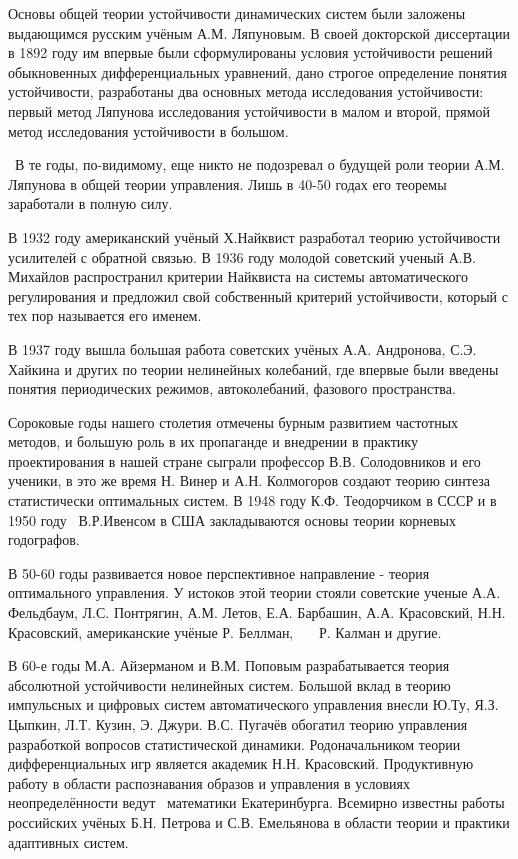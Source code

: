 		Основы общей теории устойчивости динамических систем были за­ложены выдающимся русским учёным А.М. Ляпуновым. В своей
		докторской диссертации в 1892 году им впервые были сформулированы условия ус­тойчивости решений обыкновенных
		дифференциальных уравнений, дано строгое определение понятия устойчивости, разработаны два основных метода исследования
		устойчивости: первый метод Ляпунова исследования устойчивости в малом и второй, прямой метод исследования устойчивости
		в большом.



		\ В те годы, по-видимому, еще никто не подоз­ревал о будущей роли теории А.М. Ляпунова в общей теории управления. Лишь в
		40-50 годах его теоремы заработали в полную силу.



		В 1932 году американский учёный Х.Найквист разработал теорию устойчивости усилителей с обратной связью. В 1936 году
		молодой со­ветский ученый А.В. Михайлов распространил критерии Найквиста на системы автоматического регулирования и
		предложил свой собственный критерий устойчивости, который с тех пор называется его именем.



		В 1937 году вышла большая работа советских учёных А.А. Андро­нова, С.Э. Хайкина и других по теории нелинейных колебаний,
		где впервые были введены понятия периодических режимов, автоколебаний, фазового пространства.



		Сороковые годы нашего столетия отмечены бурным развитием час­тотных методов, и большую роль в их пропаганде и внедрении
		в прак­тику проектирования в нашей стране сыграли профессор В.В. Солодовни­ков и его ученики, в это же время Н. Винер и
		А.Н. Колмогоров создают теорию синтеза статистически оптимальных систем. В 1948 году К.Ф. Теодорчиком в СССР и в 1950
		году \ В.Р.Ивенсом в США закладываются осно­вы теории корневых годографов.



		В 50-60 годы развивается новое перспективное направление - теория оптимального управления. У истоков этой теории стояли
		совет­ские ученые А.А. Фельдбаум, Л.С. Понтрягин, А.М. Летов, Е.А. Барбашин, А.А. Красовский, Н.Н. Красовский,
		американские учёные Р. Беллман, \ \ \ Р. Калман и другие.



		В 60-е годы М.А. Айзерманом и В.М. Поповым разрабатывается теория абсолютной устойчивости нелинейных систем. Большой
		вклад в теорию импульсных и цифровых систем автоматического управления внесли Ю.Ту, Я.З. Цыпкин, Л.Т. Кузин, Э. Джури.
		В.С. Пугачёв обогатил теорию управ­ления разработкой вопросов статистической динамики. Родоначальником теории
		дифференциальных игр является академик Н.Н. Красовский. Продуктивную работу в области распознавания образов и
		управления в условиях неопределённости ведут \ математики Екатеринбурга. Всемирно известны работы российских учёных
		Б.Н. Петрова и С.В. Емельянова в области те­ории и практики адаптивных систем.



